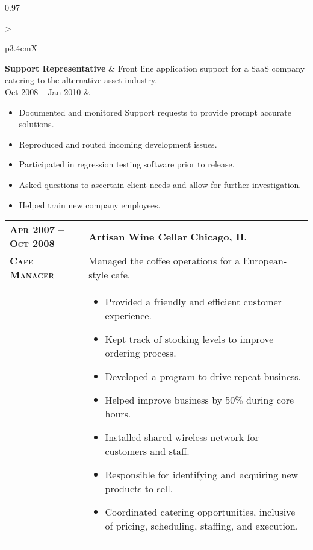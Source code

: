 \documentclass[a4paper, oneside, final]{scrartcl} %
\newcommand{\gray}{\rowcolor[gray]{.90}} %
\begin{document}
\begin{center}
\begin{tabularx}{0.97\linewidth}{>{\raggedright\scshape}p{3.4cm}X}
\textbf{Support Representative} & Front line application support for a SaaS company catering to the alternative asset industry.\\
Oct 2008 -- Jan 2010 & \vspace{-6mm}
\begin{itemize}
\setlength{\itemsep}{0cm}%
\setlength{\parskip}{0cm}%
\item Documented and monitored Support requests to provide prompt accurate solutions.
\item Reproduced and routed incoming development issues.
\item Participated in regression testing software prior to release.
\item Asked questions to ascertain client needs and allow for further investigation.
\item Helped train new company employees.
\end{itemize}
\end{tabularx}

\begin{tabularx}{0.97\linewidth}{>{\raggedright\scshape}p{3.4cm}X}
\gray \textbf{Apr 2007 -- Oct 2008} & \textbf{Artisan Wine Cellar} \hfill \textbf{Chicago, IL}\\
\textbf{Cafe Manager} & Managed the coffee operations for a European-style cafe. \\
& \vspace{-6mm}
\begin{itemize}
\setlength{\itemsep}{0cm}%
\setlength{\parskip}{0cm}%
\item Provided a friendly and efficient customer experience.
\item Kept track of stocking levels to improve ordering process.
\item Developed a program to drive repeat business.
\item Helped improve business by 50\% during core hours.
\item Installed shared wireless network for customers and staff.
\item Responsible for identifying and acquiring new products to sell.
\item Coordinated catering opportunities, inclusive of pricing, scheduling, staffing, and execution.
\end{itemize}
\end{tabularx}


\end{center}
\end{document}
